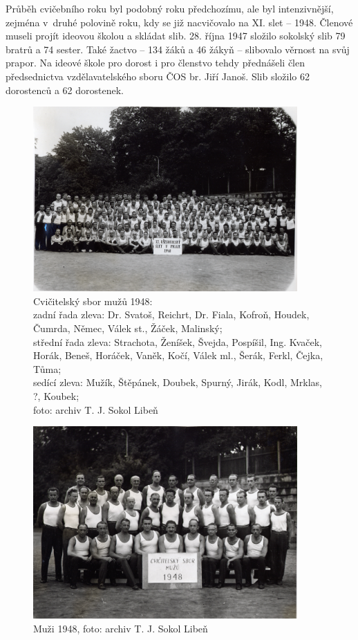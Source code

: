 \documentclass[a5paper, 11pt, twoside]{article}
\begin{document}
Průběh cvičebního roku byl podobný roku předchozímu, ale byl
intenzivnější, zejména v~druhé polovině roku, kdy se již nacvičovalo na
XI. slet -- 1948. Členové museli projít ideovou školou a skládat slib.
28. října 1947 složilo sokolský slib 79 bratrů a 74 sester. Také žactvo
-- 134 žáků a 46 žákyň -- slibovalo věrnost na svůj prapor. Na ideové
škole pro dorost i pro členstvo tehdy přednášeli člen předsednictva
vzdělavatelského sboru ČOS br. Jiří Janoš. Slib složilo 62 dorostenců a
62 dorostenek.

\begin{figure}[h!]
  \centering 
  \includegraphics[width=0.9\textwidth]{img/31_muzi_cvicitele.jpg}
  \caption*{Cvičitelský sbor mužů 1948:\\zadní řada zleva: Dr. Svatoš, Reichrt,
  Dr. Fiala, Kofroň, Houdek, Čumrda, Němec, Válek st., Žáček, Malinský;\\
  střední řada zleva: Strachota, Ženíšek, Švejda, Pospíšil, Ing. Kvaček,
  Horák, Beneš, Horáček, Vaněk, Kočí, Válek ml., Šerák, Ferkl, Čejka,
  Tůma;\\sedící zleva: Mužík, Štěpánek, Doubek, Spurný, Jirák, Kodl,
  Mrklas, ?, Koubek;\\foto: archiv T. J. Sokol Libeň}
\end{figure}

\begin{figure}[h!]
  \centering 
  \includegraphics[width=0.9\textwidth]{img/32_muzi_cvicitele.jpg}
  \caption*{Muži 1948, foto: archiv T. J. Sokol Libeň}
\end{figure}
\end{document}
